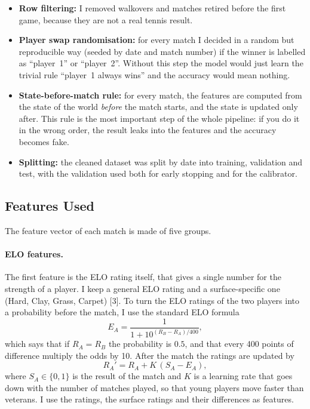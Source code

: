 \documentclass[10pt,twocolumn]{article}
\begin{document}
\begin{itemize}[leftmargin=1.2em,itemsep=2pt]
  \item \textbf{Row filtering:} I removed walkovers and matches retired
        before the first game, because they are not a real tennis
        result.
  \item \textbf{Player swap randomisation:} for every match I decided in
        a random but reproducible way (seeded by date and match number)
        if the winner is labelled as ``player~1'' or ``player~2''.
        Without this step the model would just learn the trivial rule
        ``player~1 always wins'' and the accuracy would mean nothing.
  \item \textbf{State-before-match rule:} for every match, the features
        are computed from the state of the world \emph{before} the match
        starts, and the state is updated only after. This rule is the
        most important step of the whole pipeline: if you do it in the
        wrong order, the result leaks into the features and the accuracy
        becomes fake.
  \item \textbf{Splitting:} the cleaned dataset was split by date into
        training, validation and test, with the validation used both for
        early stopping and for the calibrator.
\end{itemize}

\subsection{Features Used}
The feature vector of each match is made of five groups.

\paragraph{ELO features.} The first feature is the ELO rating itself,
that gives a single number for the strength of a player. I keep a
general ELO rating and a surface-specific one (Hard, Clay, Grass,
Carpet) [3]. To turn the ELO ratings of the two players into a
probability before the match, I use the standard ELO formula
\begin{equation}
  E_A = \frac{1}{1 + 10^{(R_B - R_A)/400}},
\end{equation}
which says that if \(R_A = R_B\) the probability is \(0.5\), and that
every 400 points of difference multiply the odds by 10. After the
match the ratings are updated by
\begin{equation}
  R_A' = R_A + K\,(S_A - E_A),
\end{equation}
where \(S_A\in\{0,1\}\) is the result of the match and \(K\) is a
learning rate that goes down with the number of matches played, so
that young players move faster than veterans. I use the ratings, the
surface ratings and their differences as features.
\end{document}
